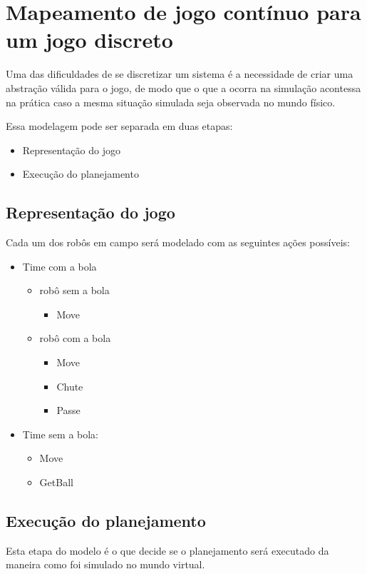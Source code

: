 \chapter{Mapeamento de jogo contínuo para um jogo discreto}\label{cap:mapeamento}

Uma das dificuldades de se discretizar um sistema é a necessidade de criar uma abstração válida para
o jogo, de modo que o que a ocorra na simulação acontessa na prática caso a mesma situação simulada
seja observada no mundo físico.

Essa modelagem pode ser separada em duas etapas:

\begin{itemize}
  \item Representação do jogo
  \item Execução do planejamento
\end{itemize}

\section{Representação do jogo}

Cada um dos robôs em campo será modelado com as seguintes ações possíveis:
\begin{itemize}
  \item Time com a bola
  \begin{itemize}
    \item robô sem a bola
    \begin{itemize}
       \item Move
    \end{itemize}
    \item robô com a bola
    \begin{itemize}
       \item Move
       \item Chute
       \item Passe
    \end{itemize}
  \end{itemize}
  \item Time sem a bola:
  \begin{itemize}
    \item Move
    \item GetBall
  \end{itemize}
\end{itemize}

\section{Execução do planejamento}

Esta etapa do modelo é o que decide se o planejamento será executado da maneira como foi simulado
no mundo virtual.
